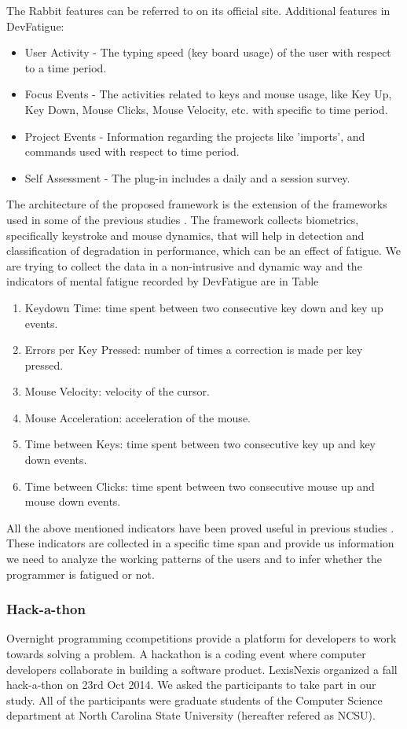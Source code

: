 \documentclass{acm_proc_article-sp}
\begin{document}
The Rabbit features can be referred to on its official
site\footnotemark[\ref{rabbitNote}].
Additional features in DevFatigue:
\begin{itemize}
	\item User Activity - The typing speed (key board usage) of the user with
	respect to a time period.
	\item Focus Events - The activities related to keys and mouse usage, like Key
	Up, Key Down, Mouse Clicks, Mouse Velocity, etc. with specific to time period.
	\item Project Events - Information regarding the projects like 'imports', and
	commands used with respect to time period.
	\item Self Assessment - The plug-in includes a daily and a session survey.
\end{itemize}
The architecture of the proposed framework is the extension of the frameworks
used in some of the previous studies \cite{pimenta:analysis}. The framework
collects biometrics, specifically keystroke and mouse dynamics, that will
help in detection and classification of degradation in performance, which can
be an effect of fatigue. We are trying to collect the data in a non-intrusive
and dynamic way and the indicators of mental fatigue recorded by DevFatigue are
in Table 
  	\begin{enumerate}
   		\item Keydown Time: time spent between two consecutive key down and key up
   		events.
   		\item Errors per Key Pressed: number of times a correction is made per key
   		pressed.
   		\item Mouse Velocity: velocity of the cursor.
   		\item Mouse Acceleration: acceleration of the mouse.
   		\item Time between Keys: time spent between two consecutive key up and key
   		down events.
   		\item Time between Clicks: time spent between two consecutive mouse up and
   		mouse down events.
    \end{enumerate}
All the above mentioned indicators have been proved useful in previous studies
\cite{pimenta:monitor} \cite{pimenta:analysis}. These indicators are
collected in a specific time span and provide us information we need to analyze
the working patterns of the users and to infer whether the programmer is
fatigued or not.

\subsubsection{Hack-a-thon}
Overnight programming ccompetitions provide a platform for developers to work
towards solving a problem. A hackathon is a coding event where computer
developers collaborate in building a software product. LexisNexis organized a
fall hack-a-thon on 23rd Oct 2014. We asked the participants to take part in our
study. All of the participants were graduate students of the Computer Science
department at North Carolina State University (hereafter refered as NCSU).
\end{document}

